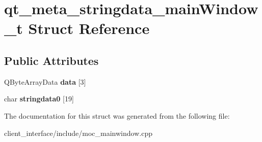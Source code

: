 \hypertarget{structqt__meta__stringdata__main_window__t}{}\section{qt\+\_\+meta\+\_\+stringdata\+\_\+main\+Window\+\_\+t Struct Reference}
\label{structqt__meta__stringdata__main_window__t}
\subsection*{Public Attributes}
\begin{DoxyCompactItemize}
\item 
\mbox{\label{structqt__meta__stringdata__main_window__t_ab43a3a6dea57c7e0704a00eb4871ed37}} 
Q\+Byte\+Array\+Data {\bfseries data} \mbox{[}3\mbox{]}
\item 
\mbox{\label{structqt__meta__stringdata__main_window__t_a15c5ced06463db8cc0a06eee1d44f22d}} 
char {\bfseries stringdata0} \mbox{[}19\mbox{]}
\end{DoxyCompactItemize}


The documentation for this struct was generated from the following file\+:\begin{DoxyCompactItemize}
\item 
client\+\_\+interface/include/moc\+\_\+mainwindow.\+cpp\end{DoxyCompactItemize}
